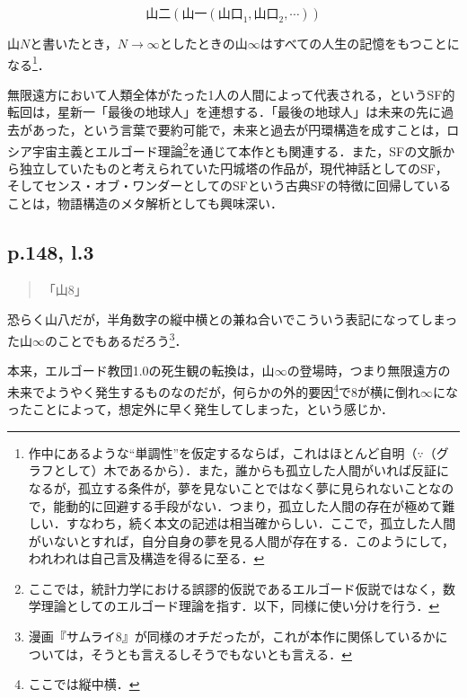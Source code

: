 \documentclass[10pt, a5paper, twoside]{jsarticle}
\theoremstyle{definition}
\begin{document}
			$$\text{山二} ( \text{山一} (\text{山口}_1, \text{山口}_2, \cdots) )$$


			山$N$と書いたとき，$N \to \infty$としたときの山$\infty$はすべての人生の記憶をもつことになる\footnote{作中にあるような“単調性”を仮定するならば，これはほとんど自明（$\because$（グラフとして）木であるから）．また，誰からも孤立した人間がいれば反証になるが，孤立する条件が，夢を見ないことではなく夢に見られないことなので，能動的に回避する手段がない．つまり，孤立した人間の存在が極めて難しい．すなわち，続く本文の記述は相当確からしい．ここで，孤立した人間がいないとすれば，自分自身の夢を見る人間が存在する．このようにして，われわれは自己言及構造を得るに至る．}．

			無限遠方において人類全体がたった1人の人間によって代表される，というSF的転回は，星新一「最後の地球人」を連想する．「最後の地球人」は未来の先に過去があった，という言葉で要約可能で，未来と過去が円環構造を成すことは，ロシア宇宙主義とエルゴード理論\footnote{ここでは，統計力学における誤謬的仮説であるエルゴード仮説ではなく，数学理論としてのエルゴード理論を指す．以下，同様に使い分けを行う．}を通じて本作とも関連する．また，SFの文脈から独立していたものと考えられていた円城塔の作品が，現代神話としてのSF，そしてセンス・オブ・ワンダーとしてのSFという古典SFの特徴に回帰していることは，物語構造のメタ解析としても興味深い．

		\subsection{p.148, l.3}

			\begin{quote}
				
				「山8」

			\end{quote}

			恐らく山八だが，半角数字の縦中横との兼ね合いでこういう表記になってしまった山$\infty$のことでもあるだろう\footnote{漫画『サムライ8』が同様のオチだったが，これが本作に関係しているかについては，そうとも言えるしそうでもないとも言える．}．

			本来，エルゴード教団1.0の死生観の転換は，山$\infty$の登場時，つまり無限遠方の未来でようやく発生するものなのだが，何らかの外的要因\footnote{ここでは縦中横．}で8が横に倒れ$\infty$になったことによって，想定外に早く発生してしまった，という感じか．
\end{document}
